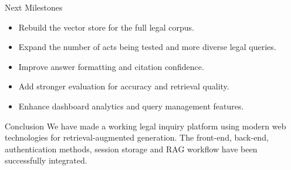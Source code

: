\documentclass[aspectratio=169]{beamer}
\begin{document}
\begin{frame}{Next Milestones}
  \begin{itemize}
    \item Rebuild the vector store for the full legal corpus.
    \item Expand the number of acts being tested and more diverse legal queries.
    \item Improve answer formatting and citation confidence.
    \item Add stronger evaluation for accuracy and retrieval quality.
    \item Enhance dashboard analytics and query management features.
  \end{itemize}
\end{frame}

\begin{frame}{Conclusion}
  \justifying
  We have made a working legal inquiry platform using modern web technologies for retrieval-augmented generation. The front-end, back-end, authentication methods, session storage and RAG workflow have been successfully integrated.
  \vspace{0.8em}
  \centering

  \vspace{0.3em}
\end{frame}
\end{document}
